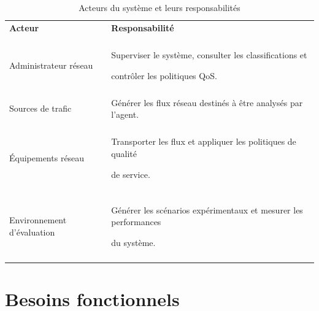 \begin{table}[H]

\centering

\caption{Acteurs du système et leurs responsabilités}

\label{tab:acteurs}

\small

\begin{tabularx}{\textwidth}{|p{3.2cm}|Y|}

\hline

\textbf{Acteur} & \textbf{Responsabilité} \\\\

\hline

Administrateur réseau &

Superviser le système, consulter les classifications et

contrôler les politiques QoS. \\\\

\hline

Sources de trafic &

Générer les flux réseau destinés à être analysés par l'agent. \\\\

\hline

Équipements réseau &

Transporter les flux et appliquer les politiques de qualité

de service. \\\\

\hline

Environnement d'évaluation &

Générer les scénarios expérimentaux et mesurer les performances

du système. \\\\

\hline

\end{tabularx}

\end{table}







\section{Besoins fonctionnels}



